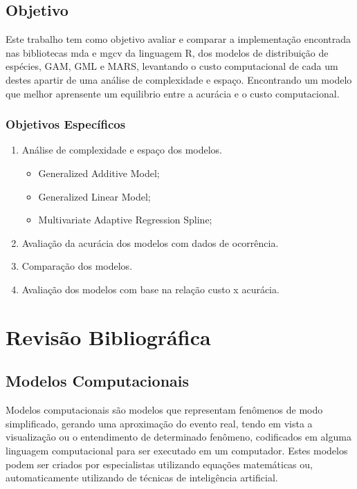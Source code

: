 \documentclass[
	12pt,				%
	openright,			%
	oneside,			%
	a4paper,			%
	english,			%
	brazil				%
	]{abntex2}
\begin{document}
\section{Objetivo}

Este trabalho tem como objetivo avaliar e comparar a implementação encontrada nas bibliotecas mda e mgcv da linguagem R, dos modelos
de distribuição de espécies, GAM, GML e MARS, levantando o custo computacional de cada um destes apartir de uma análise de 
complexidade e espaço. Encontrando um modelo que melhor aprensente um equilibrio entre a acurácia e o custo computacional.

\subsection{Objetivos Específicos}

\begin{enumerate}
	\item Análise de complexidade e espaço dos modelos.
	\begin{itemize}
		\item Generalized Additive Model;
		\item Generalized Linear Model;
		\item Multivariate Adaptive Regression Spline;
	\end{itemize}
	\item Avaliação da acurácia dos modelos com dados de ocorrência.
	\item Comparação dos modelos.
	\item Avaliação dos modelos com base na relação custo x acurácia.
\end{enumerate}



\chapter{Revisão Bibliográfica}

\section{Modelos Computacionais}

Modelos computacionais são modelos que representam fenômenos de modo simplificado, gerando uma aproximação
do evento real, tendo em vista a visualização ou o entendimento de determinado fenômeno, codificados em 
alguma linguagem computacional para ser executado em um computador. Estes modelos podem ser criados
por especialistas utilizando equações matemáticas ou, automaticamente utilizando de técnicas de
inteligência artificial. \cite{modelos_computacionais}
\end{document}
